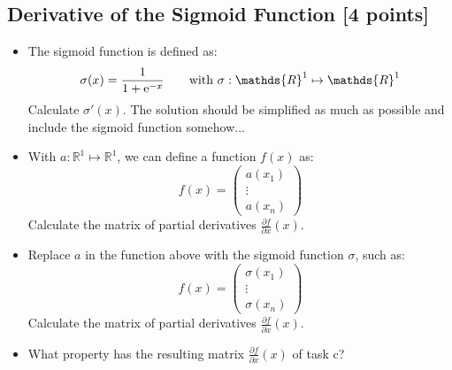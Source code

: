 \subsection{Derivative of the Sigmoid Function [4 points]}
    \begin{itemize}
        \item[a)] The sigmoid function is defined as:
            \begin{equation}
                \sigma(x) = \frac{1}{1 + {\rm e}^{-x}} \qquad \text{with } \sigma: \mathds{R}^1 \mapsto \mathds{R}^1
            \end{equation}
            Calculate $\sigma'(x)$. The solution should be simplified as much as possible and include the sigmoid function somehow...
        
        \subtaskbreak
        
        \item[b)] With $a: \mathds{R}^1 \mapsto \mathds{R}^1$, we can define a function $f(x)$ as:
            \begin{equation}
                f(x) = 
                \begin{pmatrix}
                    a(x_1) \\
                    \vdots \\
                    a(x_n)
                \end{pmatrix}
            \end{equation}
            Calculate the matrix of partial derivatives $\frac{\partial f}{\partial x}(x)$.
            
        \subtaskbreak
        
        \item[c)] Replace $a$ in the function above with the sigmoid function $\sigma$, such as:
            \begin{equation}
                f(x) = 
                \begin{pmatrix}
                    \sigma(x_1) \\
                    \vdots \\
                    \sigma(x_n)
                \end{pmatrix}
            \end{equation}
            Calculate the matrix of partial derivatives $\frac{\partial f}{\partial x}(x)$.
        
        \subtaskbreak
        
        \item[d)] What property has the resulting matrix $\frac{\partial f}{\partial x}(x)$ of task c?
        
    \end{itemize}
    

